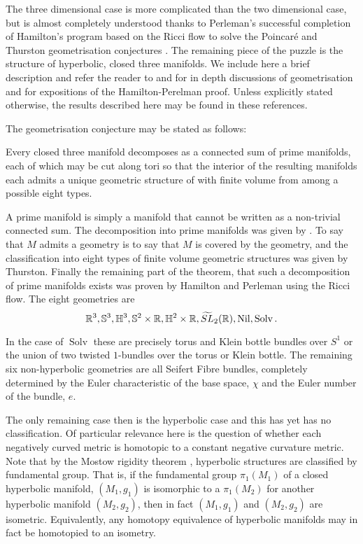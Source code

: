 \documentclass[a4paper,12pt]{amsart}
\begin{document}
The three dimensional case is more complicated than the two dimensional case, but is almost completely understood thanks to Perleman's successful completion \cite{2003math......7245P,2003math......3109P,2002math.....11159P} of Hamilton's program based on the Ricci flow \cite{Hamilton:/1982} to solve the Poincar\'e and Thurston geometrisation conjectures \cite{MR648524}. The remaining piece of the puzzle is the structure of hyperbolic, closed three manifolds. We include here a brief description and refer the reader to \cite{MR705527} and \cite{MR1435975} for in depth discussions of geometrisation and \cite{MR3186136,MR2334563,MR2460872} for expositions of the Hamilton-Perelman proof. Unless explicitly stated otherwise, the results described here may be found in these references.

The geometrisation conjecture may be stated as follows:

\begin{thm}
Every closed three manifold decomposes as a connected sum of prime manifolds, each of which may be cut along tori so that the interior of the resulting manifolds each admits a unique geometric structure of with finite volume from among a possible eight types.
\end{thm}

A prime manifold is simply a manifold that cannot be written as a non-trivial connected sum. The decomposition into prime manifolds was given by \cite{MR0142125}. To say that \(M\) admits a geometry is to say that \(M\) is covered by the geometry, and the classification into eight types of finite volume geometric structures was given by Thurston. Finally the remaining part of the theorem, that such a decomposition of prime manifolds exists was proven by Hamilton and Perleman using the Ricci flow. The eight geometries are
\[
\mathbb{R}^3, \mathbb{S}^3, \mathbb{H}^3, \mathbb{S}^2 \times \mathbb{R}, \mathbb{H}^2 \times \mathbb{R}, \widetilde{SL}_2(\mathbb{R}), \operatorname{Nil}, \operatorname{Solv}.
\]

In the case of \(\operatorname{Solv}\) these are precisely torus and Klein bottle bundles over \(S^1\) or the union of two twisted \(1\)-bundles over the torus or Klein bottle. The remaining six non-hyperbolic geometries are all Seifert Fibre bundles, completely determined by the Euler characteristic of the base space, \(\chi\) and the Euler number of the bundle, \(e\).

The only remaining case then is the hyperbolic case and this has yet has no classification. Of particular relevance here is the question of whether each negatively curved metric is homotopic to a constant negative curvature metric. Note that by the Mostow rigidity theorem \cite{MR0236383}, hyperbolic structures are classified by fundamental group. That is, if the fundamental group \(\pi_1(M_1)\) of a closed hyperbolic manifold, \((M_1, g_1)\) is isomorphic to a \(\pi_1(M_2)\) for another hyperbolic manifold \((M_2, g_2)\), then in fact \((M_1, g_1)\) and \((M_2, g_2)\) are isometric. Equivalently, any homotopy equivalence of hyperbolic manifolds may in fact be homotopied to an isometry.
\end{document}
